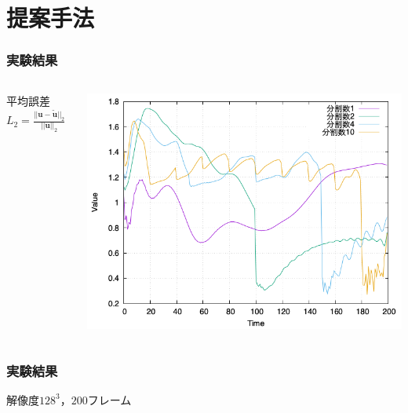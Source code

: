 \documentclass[aspectratio=169,dvipdfmx,hyperref={bookmarks=true}]{beamer}
\begin{document}
\section{提案手法}
\begin{frame}
\frametitle{実験結果}

\begin{columns}[T]
	\begin{column}{0.3\linewidth}
	\begin{block}{}
	平均誤差$L_2 = \frac{|| \bm{u} - \bm{\widetilde{u}} ||_2}{||  \bm{u} ||_2}$
	\end{block}
    	\end{column}
	\begin{column}{0.6\linewidth}
		\includegraphics[width=0.89\linewidth]{images/128error.png}
	   \end{column}
    \end{columns}

 \end{frame}
  
 \begin{frame}
 \frametitle{実験結果}
\begin{block}{}
解像度$128^3$，$200$フレーム
\end{block}
\begin{columns}
    \begin{column}{0.33\textwidth}
    \end{column}
    \begin{column}{0.33\textwidth}
    \end{column}
    \begin{column}{0.33\textwidth}
    \end{column}
\end{columns}
\end{frame}
  
\end{document}
